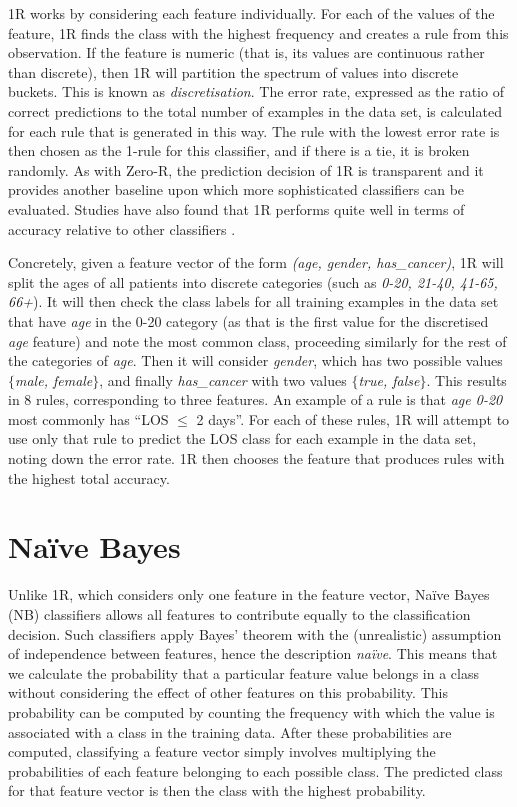 1R works by considering each feature individually.
For each of the values of the
feature, 1R finds the class with the highest frequency and creates a rule
from this observation. If the feature is numeric (that is, its values are
continuous rather than discrete), then 1R will partition the spectrum of
values into discrete buckets. This is known as \textit{discretisation}.
The error rate, expressed as the ratio of correct predictions to the total
number of examples in the data set,
is calculated for each rule that is generated
in this way. The rule with the lowest error rate is then chosen as the 1-rule
for this classifier,
and if there is a tie, it is broken randomly. As with Zero-R, the prediction
decision of 1R is transparent and it provides another baseline upon which
more sophisticated classifiers can be evaluated. Studies have also found that
1R performs quite well in terms of accuracy relative to other classifiers
\cite{Holte1993}.

Concretely, given a feature
vector of the form \textit{(age, gender, has\_cancer)},
1R will split the ages of
all patients into discrete categories
(such as \textit{0-20, 21-40, 41-65, 66+}). It
will then check the class labels for all training examples in the data set
that have \textit{age} in the 0-20 category
(as that is the first value for the discretised \textit{age} feature) and
note the most common class, proceeding similarly for the rest of the
categories of \textit{age}. Then it will consider \textit{gender}, which has
two possible values $\{$\textit{male, female}$\}$, and finally \textit{has\_cancer}
with two values $\{$\textit{true, false}$\}$. This results in 8 rules,
corresponding to three features.
An example of a rule is that \textit{age 0-20} most commonly
has ``LOS $\leq$ 2 days''. For each of these rules, 1R will attempt to
use only that rule to predict the LOS class for each example in the data set,
noting down the error rate. 1R then chooses the feature that produces rules
with the highest total accuracy.

\section{Na\"{i}ve Bayes}
Unlike 1R, which considers only one feature in the feature vector, Na\"{i}ve
Bayes (NB) classifiers allows all features to contribute equally to the
classification decision. Such classifiers apply Bayes' theorem with the
(unrealistic) assumption of independence between features, hence the
description \textit{na\"{i}ve}. This means that we
calculate the probability that a particular feature value belongs in a class
without considering the effect of other features on this probability. This
probability can be computed by
counting the frequency with which the value is associated with a class in the
training data. After these probabilities are computed, classifying a feature
vector simply involves multiplying the probabilities of each feature belonging
to each possible class. The predicted class for that feature vector is then the
class with the highest probability.

